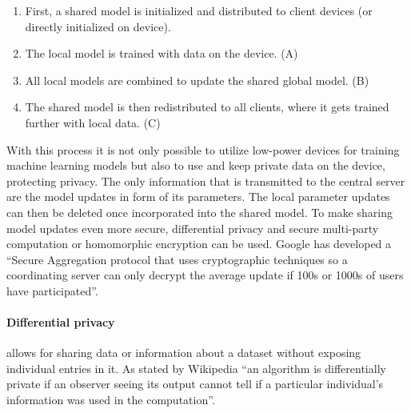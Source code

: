 \begin{enumerate}
    \item First, a shared model is initialized and distributed to client devices (or directly initialized on device).
    \item The local model is trained with data on the device. (A)
    \item All local models are combined to update the shared global model. (B) 
    \item The shared model is then redistributed to all clients, where it gets trained further with local data. (C)
\end{enumerate}

With this process it is not only possible to utilize low-power devices for training machine learning models but also to use and keep private data on the device, protecting privacy. The only information that is transmitted to the central server are the model updates in form of its parameters. The local parameter updates can then be deleted once incorporated into the shared model. To make sharing model updates even more secure, differential privacy and secure multi-party computation or homomorphic encryption can be used. Google has developed a \enquote{Secure Aggregation protocol that uses cryptographic techniques so a coordinating server can only decrypt the average update if 100s or 1000s of users have participated}\cite{google_ai_federated_learning}.

\paragraph{Differential privacy} allows for sharing data or information about a dataset without exposing individual entries in it. As stated by Wikipedia \enquote{an algorithm is differentially private if an observer seeing its output cannot tell if a particular individual's information was used in the computation}\cite{wiki_dp}.

